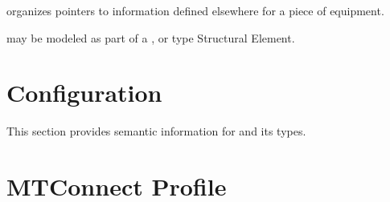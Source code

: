 organizes pointers to information defined elsewhere for a piece of equipment.

 may be modeled as part of a ,  or  type \gls{Structural Element}.



\section{Configuration}
\label{sec:Configuration}

This section provides semantic information for  and its types.













\section{MTConnect Profile}
\label{sec:MTConnect Profile}





